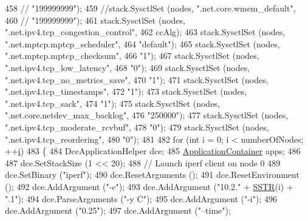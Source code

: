 \begin{DoxyCode}
{{{458   \textcolor{comment}{//                 "199999999");}
459   \textcolor{comment}{//stack.SysctlSet (nodes, ".net.core.wmem\_default",}
460   \textcolor{comment}{//                 "199999999");}
461   stack.SysctlSet (nodes, \textcolor{stringliteral}{".net.ipv4.tcp\_congestion\_control"},
462                    ccAlg);
463   stack.SysctlSet (nodes, \textcolor{stringliteral}{".net.mptcp.mptcp\_scheduler"},
464                    \textcolor{stringliteral}{"default"});
465   stack.SysctlSet (nodes, \textcolor{stringliteral}{".net.mptcp.mptcp\_checksum"},
466                     \textcolor{stringliteral}{"1"});
467   stack.SysctlSet (nodes, \textcolor{stringliteral}{".net.ipv4.tcp\_low\_latency"},
468                     \textcolor{stringliteral}{"0"});
469   stack.SysctlSet (nodes, \textcolor{stringliteral}{".net.ipv4.tcp\_no\_metrics\_save"},
470                     \textcolor{stringliteral}{"1"});
471   stack.SysctlSet (nodes, \textcolor{stringliteral}{".net.ipv4.tcp\_timestamps"},
472                     \textcolor{stringliteral}{"1"});
473   stack.SysctlSet (nodes, \textcolor{stringliteral}{".net.ipv4.tcp\_sack"},
474                     \textcolor{stringliteral}{"1"});
475   stack.SysctlSet (nodes, \textcolor{stringliteral}{".net.core.netdev\_max\_backlog"},
476                     \textcolor{stringliteral}{"250000"});
477   stack.SysctlSet (nodes, \textcolor{stringliteral}{".net.ipv4.tcp\_moderate\_rcvbuf"},
478                     \textcolor{stringliteral}{"0"});
479   stack.SysctlSet (nodes, \textcolor{stringliteral}{".net.ipv4.tcp\_reordering"},
480                     \textcolor{stringliteral}{"0"});
481 
482   \textcolor{keywordflow}{for} (\textcolor{keywordtype}{int} i = 0; i < numberOfNodes; ++\hyperlink{bernuolliDistribution_8m_a6f6ccfcf58b31cb6412107d9d5281426}{i})
483   \{
484     DceApplicationHelper dce;
485     \hyperlink{classns3_1_1ApplicationContainer}{ApplicationContainer} apps;
486 
487     dce.SetStackSize (1 << 20);
488     \textcolor{comment}{// Launch iperf client on node 0}
489     dce.SetBinary (\textcolor{stringliteral}{"iperf"});
490     dce.ResetArguments ();
491     dce.ResetEnvironment ();
492     dce.AddArgument (\textcolor{stringliteral}{"-c"});
493     dce.AddArgument (\textcolor{stringliteral}{"10.2."} + \hyperlink{dce-example-mptcp-mmwave_8cc_a0d2f37137ee1fd6ff4a0ef803849dd63}{SSTR}(i) + \textcolor{stringliteral}{".1"});
494     dce.ParseArguments (\textcolor{stringliteral}{"-y C"});
495     dce.AddArgument (\textcolor{stringliteral}{"-i"});
496     dce.AddArgument (\textcolor{stringliteral}{"0.25"});
497     dce.AddArgument (\textcolor{stringliteral}{"--time"});
}}}
\end{DoxyCode}
